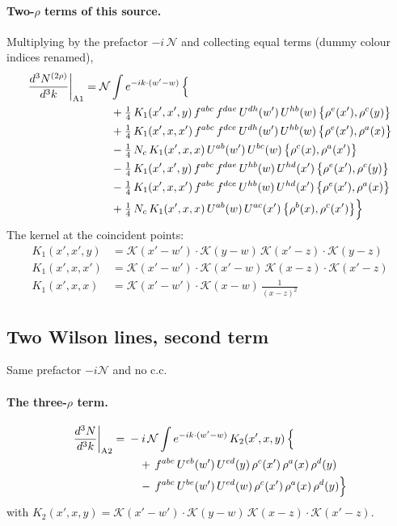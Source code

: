 \documentclass[10pt]{article}
\numberwithin{equation}{section}
\newcommand{\KK}{\mathcal K}
\newcommand{\NN}{\mathcal N}
\begin{document}
\paragraph{Two-$\rho$ terms of this source.} Multiplying by the prefactor $-i\,\NN$ and collecting equal terms (dummy colour indices renamed),
\begin{align}
\frac{d^3N^{(2\rho)}}{d^3k}\bigg|_{\rm A1}={}&\NN\int e^{-ik\cdot(w'-w)}\,\Big\{\notag\\
&\quad +\tfrac14\,K_1(x',x',y)\,f^{abc}\,f^{dae}\,U^{dh}(w')\,U^{hb}(w)\,\big\{\rho^{e}(x'),\rho^{c}(y)\big\}\notag\\
&\quad +\tfrac14\,K_1(x',x,x')\,f^{abc}\,f^{dce}\,U^{dh}(w')\,U^{hb}(w)\,\big\{\rho^{e}(x'),\rho^{a}(x)\big\}\notag\\
&\quad -\tfrac14\,N_{c}\,K_1(x',x,x)\,U^{ab}(w')\,U^{bc}(w)\,\big\{\rho^{c}(x),\rho^{a}(x')\big\}\notag\\
&\quad -\tfrac14\,K_1(x',x',y)\,f^{abc}\,f^{dae}\,U^{hb}(w)\,U^{hd}(x')\,\big\{\rho^{e}(x'),\rho^{c}(y)\big\}\notag\\
&\quad -\tfrac14\,K_1(x',x,x')\,f^{abc}\,f^{dce}\,U^{hb}(w)\,U^{hd}(x')\,\big\{\rho^{e}(x'),\rho^{a}(x)\big\}\notag\\
&\quad +\tfrac14\,N_{c}\,K_1(x',x,x)\,U^{ab}(w)\,U^{ac}(x')\,\big\{\rho^{b}(x),\rho^{c}(x')\big\}\Big\}\label{eq:res-A1}
\end{align}
The kernel at the coincident points:
\begin{align*}
K_1(x',x',y)&=\KK(x'-w')\cdot\KK(y-w)\,\KK(x'-z)\cdot\KK(y-z)\\K_1(x',x,x')&=\KK(x'-w')\cdot\KK(x'-w)\,\KK(x-z)\cdot\KK(x'-z)\\K_1(x',x,x)&=\KK(x'-w')\cdot\KK(x-w)\,\frac{1}{(x-z)^2}
\end{align*}
\subsection{Two Wilson lines, second term}\label{sec:A2}
Same prefactor $-i\NN$ and no c.c.
\paragraph{The three-$\rho$ term.}
\begin{align}
\frac{d^3N}{d^3k}\bigg|_{\rm A2}={}&-i\,\NN\int e^{-ik\cdot(w'-w)}\,K_2(x',x,y)\,\Big\{\notag\\
&\quad +\,f^{abc}\,U^{eb}(w')\,U^{ed}(y)\,\rho^{c}(x')\,\rho^{a}(x)\,\rho^{d}(y)\notag\\
&\quad -\,f^{abc}\,U^{be}(w')\,U^{ed}(w)\,\rho^{c}(x')\,\rho^{a}(x)\,\rho^{d}(y)\Big\}\label{eq:in-A2}
\end{align}
with $K_2(x',x,y)=\KK(x'-w')\cdot\KK(y-w)\,\KK(x-z)\cdot\KK(x'-z)$.
\end{document}
